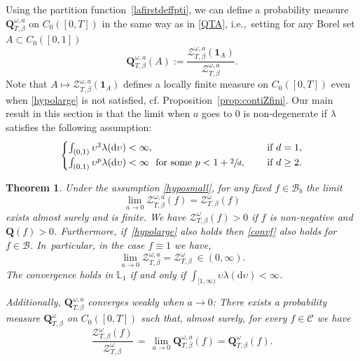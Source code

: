 \documentclass[11pt]{article}
\newcommand{\ie}{i.e.,\xspace}
\newcommand{\cf}{cf.\xspace}
\numberwithin{equation}{section}
\let\mathcal\mathscr
\newtheorem{theorem}{Theorem}[section]
\theoremstyle{definition}
\newcommand{\dd}{\mathrm{d}}
\newcommand{\ind}{\mathbf{1}}
\newcommand{\cB}{{\ensuremath{\mathcal B}} }
\newcommand{\cC}{{\ensuremath{\mathcal C}} }
\newcommand{\cZ}{{\ensuremath{\mathcal Z}} }
\newcommand{\bQ}{{\ensuremath{\mathbf Q}} }
\newcommand{\bbL}{{\ensuremath{\mathbb L}} }
\let\gl\lambda
\let\ups\upsilon
\let\go\omega
\begin{document}
 Using the partition function~\eqref{lafirstdeffpti}, we can define a probability measure $\bQ^{\go,a}_{T,\beta}$ on $C_0([0,T])$ in the same way as in \eqref{QTA}, \ie \ setting for any Borel set $A\subset C_0([0,1])$ \,
\[
\bQ^{\go,a}_{T,\beta}(A):= \frac{\cZ^{\go,a}_{T,\beta}(\ind_{A})}{ \cZ^{\go,a}_{T,\beta} }.
\]
Note that $A\mapsto \cZ^{\go,a}_{T,\beta}(\ind_{A})$ defines a locally finite measure on $C_0([0,T])$ even when \eqref{hypolarge} is not satisfied, \cf Proposition~\ref{prop:contiZfini}.
Our main result in this section is that the limit when $a$ goes to $0$ is non-degenerate if $\gl$ satisfies the following assumption:
\begin{equation}\label{hyposmall}
\begin{cases}
\int_{(0,1)} \ups^{2} \gl(\dd \ups)<\infty, \quad &\text{ if } d=1,\\
\int_{(0,1)} \ups^{p} \gl(\dd \ups)<\infty \ \text{ for some } p<1+\sfrac{2}{d}, \quad &\text{ if } d\ge 2.
\end{cases}
\end{equation}

\begin{theorem}\label{thm:zalpha}
Under the assumption \eqref{hyposmall}, for any fixed $f\in \cB_b$ the limit
\begin{equation}\label{convf}
\lim_{a\to 0}\cZ^{\go,a}_{T,\beta}(f)= \cZ^{\go}_{T,\beta}(f)
\end{equation}
exists almost surely and is finite. We have $\cZ^{\go}_{T,\beta}(f)>0$ if $f$ is non-negative and $\bQ(f)>0$.
Furthermore, if~\eqref{hypolarge} also holds then \eqref{convf} also holds for $f\in \mathcal B$. In~particular, in the case $f\equiv 1$ we have,
\begin{equation}\label{convparty}
\lim_{a\to 0}\cZ^{\go,a}_{T,\beta}= \cZ^{\go}_{T,\beta} \ \in (0,\infty).
\end{equation}
The convergence holds in $\bbL_1$ if and only if $\int_{[1,\infty)} \ups \gl(\dd \ups)<\infty$.

 Additionally, $\bQ^{\go,a}_{T,\beta}$ converges weakly when $a\to 0$: There exists a probability measure $\bQ^{\go}_{T,\beta}$ on $C_0([0,T])$ such that, almost surely, for every
$f\in \cC$ we have
\begin{equation}\label{lescontis}
\frac{ \cZ^{\go}_{T,\beta}(f)}{ \cZ^{\go}_{T,\beta}}\, =\, \lim_{a\to 0}\bQ^{\go,a}_{T,\beta}(f)= \bQ^{\go}_{T,\beta}(f).
\end{equation}
\end{theorem}
\end{document}
